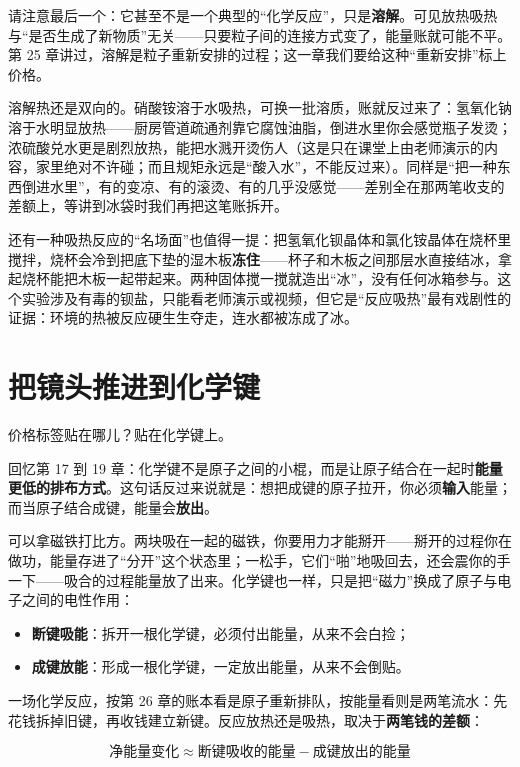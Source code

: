 请注意最后一个：它甚至不是一个典型的“化学反应”，只是\textbf{溶解}。可见放热吸热与“是否生成了新物质”无关——只要粒子间的连接方式变了，能量账就可能不平。第 25 章讲过，溶解是粒子重新安排的过程；这一章我们要给这种“重新安排”标上价格。

溶解热还是双向的。硝酸铵溶于水吸热，可换一批溶质，账就反过来了：氢氧化钠溶于水明显放热——厨房管道疏通剂靠它腐蚀油脂，倒进水里你会感觉瓶子发烫；浓硫酸兑水更是剧烈放热，能把水溅开烫伤人（这是只在课堂上由老师演示的内容，家里绝对不许碰；而且规矩永远是“酸入水”，不能反过来）。同样是“把一种东西倒进水里”，有的变凉、有的滚烫、有的几乎没感觉——差别全在那两笔收支的差额上，等讲到冰袋时我们再把这笔账拆开。

还有一种吸热反应的“名场面”也值得一提：把氢氧化钡晶体和氯化铵晶体在烧杯里搅拌，烧杯会冷到把底下垫的湿木板\textbf{冻住}——杯子和木板之间那层水直接结冰，拿起烧杯能把木板一起带起来。两种固体搅一搅就造出“冰”，没有任何冰箱参与。这个实验涉及有毒的钡盐，只能看老师演示或视频，但它是“反应吸热”最有戏剧性的证据：环境的热被反应硬生生夺走，连水都被冻成了冰。

\section{把镜头推进到化学键}

价格标签贴在哪儿？贴在化学键上。

回忆第 17 到 19 章：化学键不是原子之间的小棍，而是让原子结合在一起时\textbf{能量更低的排布方式}。这句话反过来说就是：想把成键的原子拉开，你必须\textbf{输入}能量；而当原子结合成键，能量会\textbf{放出}。

可以拿磁铁打比方。两块吸在一起的磁铁，你要用力才能掰开——掰开的过程你在做功，能量存进了“分开”这个状态里；一松手，它们“啪”地吸回去，还会震你的手一下——吸合的过程能量放了出来。化学键也一样，只是把“磁力”换成了原子与电子之间的电性作用：

\begin{itemize}[itemsep=2pt]
\item \textbf{断键吸能}：拆开一根化学键，必须付出能量，从来不会白捡；
\item \textbf{成键放能}：形成一根化学键，一定放出能量，从来不会倒贴。
\end{itemize}

一场化学反应，按第 26 章的账本看是原子重新排队，按能量看则是两笔流水：先花钱拆掉旧键，再收钱建立新键。反应放热还是吸热，取决于\textbf{两笔钱的差额}：

\[ \text{净能量变化} \approx \text{断键吸收的能量} - \text{成键放出的能量} \]

